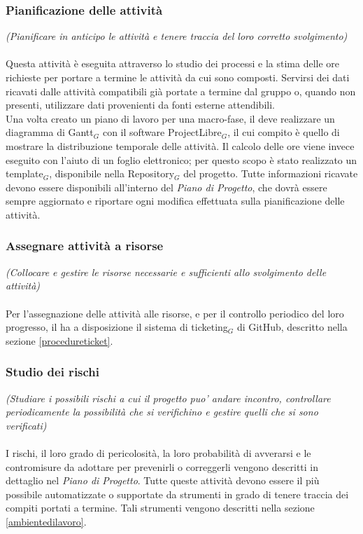 \subsubsection{Pianificazione delle attività}
\textit{(Pianificare in anticipo le attività e tenere traccia del loro corretto svolgimento)} \\ \\
Questa attività è eseguita attraverso lo studio dei processi e la stima delle ore richieste per portare a termine le attività da cui sono composti. Servirsi dei dati ricavati dalle attività compatibili già portate a termine dal gruppo o, quando non presenti, utilizzare dati provenienti da fonti esterne attendibili. \\
Una volta creato un piano di lavoro per una macro-fase, il \ruoloResponsabile{}  deve realizzare un diagramma di Gantt$_G$ con il software ProjectLibre$_G$, il cui compito è quello di mostrare la distribuzione temporale delle attività. Il calcolo delle ore viene invece eseguito con l'aiuto di un foglio elettronico; per questo scopo è stato realizzato un template$_G$, disponibile nella Repository$_G$ del progetto. Tutte informazioni ricavate devono essere disponibili all'interno del \textit{Piano di Progetto}, che dovrà essere sempre aggiornato e riportare ogni modifica effettuata sulla pianificazione delle attività.

\subsubsection{Assegnare attività a risorse}
\textit{(Collocare e gestire le risorse necessarie e sufficienti allo svolgimento delle attività)}\\ \\
Per l'assegnazione delle attività alle risorse, e per il controllo periodico del loro progresso, il \ruoloResponsabile{} ha a disposizione il sistema di ticketing$_G$ di GitHub, descritto nella sezione \ref{procedureticket}.
\subsubsection{Studio dei rischi}
\textit{(Studiare i possibili rischi a cui il progetto puo' andare incontro, controllare periodicamente la possibilità che si verifichino e gestire quelli che si sono verificati)}\\ \\
I rischi, il loro grado di pericolosità, la loro probabilità di avverarsi e le contromisure da adottare per prevenirli o correggerli vengono descritti in dettaglio nel \textit{Piano di Progetto}.
Tutte queste attività devono essere il più possibile automatizzate o supportate da strumenti in grado di tenere traccia dei compiti portati a termine. Tali strumenti vengono descritti nella sezione \ref{ambientedilavoro}.


